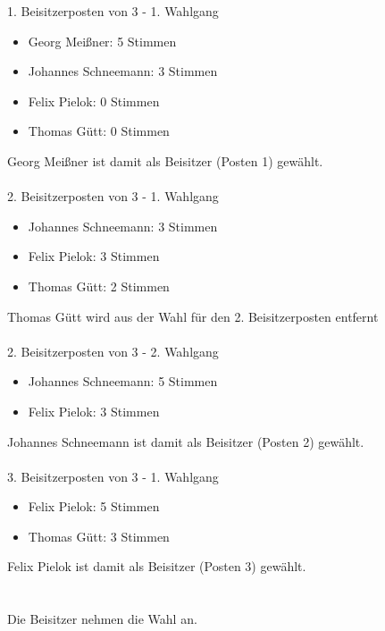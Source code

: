 \documentclass[10pt,a4paper]{scrartcl}
\begin{document}
1. Beisitzerposten von 3 - 1. Wahlgang
\begin{itemize}
\item Georg Mei{\ss}ner: 5 Stimmen
\item Johannes Schneemann: 3 Stimmen
\item Felix Pielok: 0 Stimmen
\item Thomas G{\"u}tt: 0 Stimmen
\end{itemize}
    Georg Mei{\ss}ner ist damit als Beisitzer (Posten 1) gew{\"a}hlt.\\\\
2. Beisitzerposten von 3 - 1. Wahlgang
\begin{itemize}
\item Johannes Schneemann: 3 Stimmen
\item Felix Pielok: 3 Stimmen
\item Thomas G{\"u}tt: 2 Stimmen
\end{itemize}
    Thomas G{\"u}tt wird aus der Wahl f{\"u}r den 2. Beisitzerposten entfernt\\\\
2. Beisitzerposten von 3 - 2. Wahlgang
\begin{itemize}
\item Johannes Schneemann: 5 Stimmen
\item Felix Pielok: 3 Stimmen
\end{itemize}
    Johannes Schneemann ist damit als Beisitzer (Posten 2) gew{\"a}hlt.\\\\
3. Beisitzerposten von 3 - 1. Wahlgang
\begin{itemize}
\item Felix Pielok: 5 Stimmen
\item Thomas G{\"u}tt: 3 Stimmen
\end{itemize}
    Felix Pielok ist damit als Beisitzer (Posten 3) gew{\"a}hlt.\\\\
\\
Die Beisitzer nehmen die Wahl an.
\end{document}
